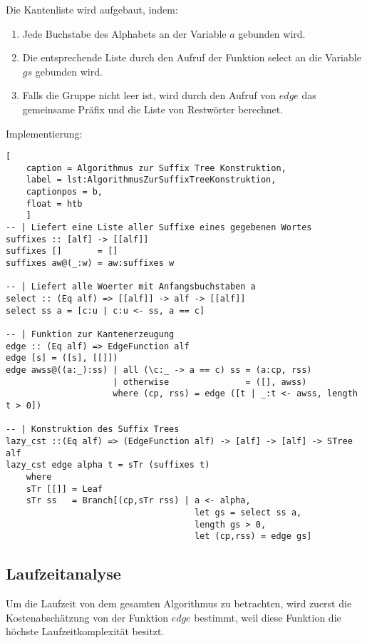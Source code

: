 \documentclass[12pt]{report}
\begin{document}
Die Kantenliste wird aufgebaut, indem:
\begin{enumerate}
    \item Jede Buchstabe des Alphabets an der Variable $a$ gebunden wird.
    \item Die entsprechende Liste durch den Aufruf der Funktion select an die Variable $gs$ gebunden wird.
    \item Falls die Gruppe nicht leer ist, wird durch den Aufruf von $edge$ das gemeinsame Präfix und die Liste von Restwörter berechnet.
\end{enumerate}
Implementierung:
\begin{lstlisting}[
    caption = Algorithmus zur Suffix Tree Konstruktion,
    label = lst:AlgorithmusZurSuffixTreeKonstruktion,
    captionpos = b,
    float = htb
    ]
-- | Liefert eine Liste aller Suffixe eines gegebenen Wortes
suffixes :: [alf] -> [[alf]]
suffixes []       = []
suffixes aw@(_:w) = aw:suffixes w

-- | Liefert alle Woerter mit Anfangsbuchstaben a
select :: (Eq alf) => [[alf]] -> alf -> [[alf]]
select ss a = [c:u | c:u <- ss, a == c]

-- | Funktion zur Kantenerzeugung
edge :: (Eq alf) => EdgeFunction alf
edge [s] = ([s], [[]])
edge awss@((a:_):ss) | all (\c:_ -> a == c) ss = (a:cp, rss)
                     | otherwise               = ([], awss)
                     where (cp, rss) = edge ([t | _:t <- awss, length t > 0])

-- | Konstruktion des Suffix Trees
lazy_cst ::(Eq alf) => (EdgeFunction alf) -> [alf] -> [alf] -> STree alf
lazy_cst edge alpha t = sTr (suffixes t)
    where
    sTr [[]] = Leaf
    sTr ss   = Branch[(cp,sTr rss) | a <- alpha,
                                     let gs = select ss a,
                                     length gs > 0,
                                     let (cp,rss) = edge gs]
\end{lstlisting}
\label{lst:cstImplementierung}

\subsection{Laufzeitanalyse}
\label{sec:Laufzeitanalyse}

Um die Laufzeit von dem gesamten Algorithmus zu betrachten, wird zuerst die Kostenabschätzung von der Funktion $edge$ bestimmt, weil diese Funktion die höchste Laufzeitkomplexität besitzt.
\end{document}
